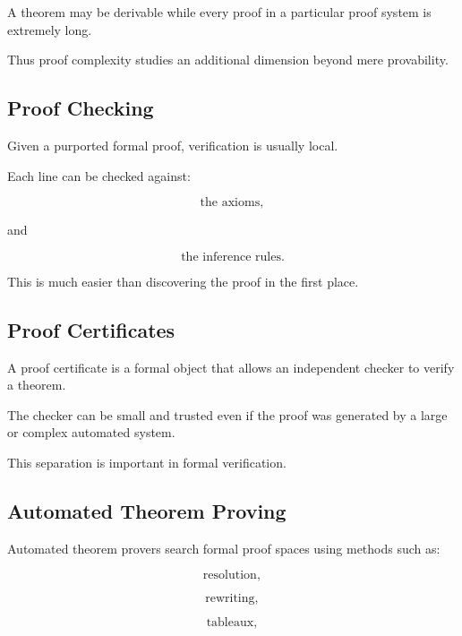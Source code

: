 A theorem may be derivable while every proof in a particular proof system
is extremely long.

Thus proof complexity studies an additional dimension beyond mere
provability.

\subsection{Proof Checking}
\label{subsec:formal-proof-checking}

Given a purported formal proof, verification is usually local.

Each line can be checked against:

\[
\boxed{
\text{the axioms},
}
\]

and

\[
\boxed{
\text{the inference rules}.
}
\]

This is much easier than discovering the proof in the first place.

\subsection{Proof Certificates}
\label{subsec:proof-certificates}

A proof certificate is a formal object that allows an independent checker
to verify a theorem.

The checker can be small and trusted even if the proof was generated by a
large or complex automated system.

This separation is important in formal verification.

\subsection{Automated Theorem Proving}
\label{subsec:automated-theorem-proving-proof-theory}

Automated theorem provers search formal proof spaces using methods such as:

\[
\boxed{
\text{resolution},
}
\]

\[
\boxed{
\text{rewriting},
}
\]

\[
\boxed{
\text{tableaux},
}
\]

